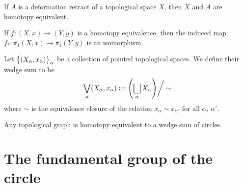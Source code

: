 \documentclass[11pt,a4paper]{article}
\begin{document}
\begin{example}
  If $A$ is a deformation retract of a topological space $X$,
  then $X$ and $A$ are homotopy equivalent.
\end{example}

\begin{proposition}
  If $f \colon (X,x) \to (Y,y)$ is a homotopy equivalence,
  then the induced map $f_* \colon \pi_1(X,x) \to \pi_1(Y,y)$
  is an isomorphism.
\end{proposition}

\begin{definition}
  Let $\set{\pair{X_{\alpha},x_{\alpha}}}_{\alpha}$ be a collection of
  pointed topological spaces.
  We define their wedge sum to be
  \[
    \bigvee_{\alpha} (X_{\alpha}, x_{\alpha}) :=
    \del{\bigsqcup_{\alpha} X_{\alpha}} \biggr/ \sim
  \]
  where $\sim$ is the equivalence closure of the relation
  $x_{\alpha} \sim x_{\alpha'}$ for all $\alpha$, $\alpha'$.
\end{definition}

\begin{proposition}
  Any topological graph is homotopy equivalent to a wedge sum
  of circles.
\end{proposition}

\newpage

\section{The fundamental group of the circle}
\end{document}
